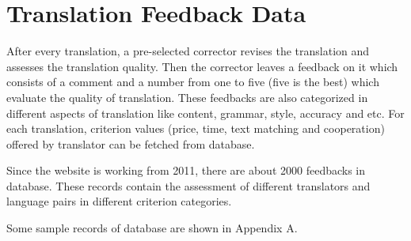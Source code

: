 \section{Translation Feedback Data}
After every translation, a pre-selected corrector revises the translation and assesses the translation quality. Then the corrector leaves a feedback on it which consists of a comment and a number from one to five (five is the best) which evaluate the quality of translation. These feedbacks are also categorized in different aspects of translation like content, grammar, style, accuracy and etc. For each translation, criterion values (price, time, text matching and cooperation) offered by translator can be fetched from database.

Since the website is working from 2011, there are about 2000 feedbacks in database. These records contain the assessment of different translators and language pairs in different criterion categories.

Some sample records of database are shown in Appendix A.